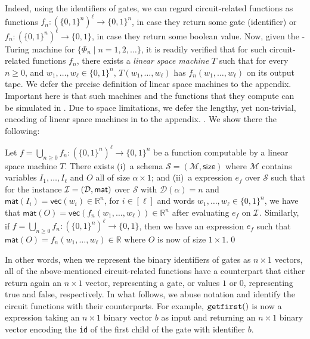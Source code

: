 Indeed, using the identifiers of gates, we can regard circuit-related functions as functions $f_n:(\lbrace 0,1 \rbrace^{n})^\ell\rightarrow\lbrace 0,1 \rbrace^n$, in case they return some gate (identifier) or $f_n:(\lbrace 0,1 \rbrace^{n})^\ell\rightarrow\lbrace 0,1 \rbrace$,
in case they return some boolean value. Now, given the \logspace-Turing machine for $\{\Phi_n\mid n=1,2,\ldots\}$, it is readily verified that for such
circuit-related functions $f_n$, there exists a \textit{linear
space machine} $T$ such that for every $n\geq 0$, and $w_1,\ldots,w_\ell\in\{0,1\}^n$, $T(w_1,\ldots,w_\ell)$ has $f_n(w_1,\ldots,w_\ell)$ on its output tape. We defer the precise definition of linear space machines to the appendix.
Important here is that such machines and the functions that they compute can be simulated in \langfor.
Due to space limitations, we defer the lengthy, yet non-trivial, encoding of linear space machines in \langfor to the appendix.
.
We show there the following:

\begin{proposition} \label{prop:transducer2}
Let $f=\bigcup_{n\geq 0}f_n:(\{0,1\}^n)^\ell\to \{0,1\}^n$ be a function computable by a linear space machine
$T$.
There exists (i)~a \langfor  
schema $\mathcal{S}=(\mathcal{M},\textsf{size})$ where $\mathcal{M}$ contains variables
$I_1,\ldots,I_\ell$ and $O$ all of size $\alpha\times 1$; and (ii)~a \langfor 
expression $e_f$ over $\mathcal{S}$ such that for the instance 
$\mathcal{I}=(\mathcal{D},\textsf{mat})$ over $\mathcal{S}$ with $\mathcal{D}(\alpha)=n$ and 
$\mathsf{mat}(I_i)=\mathsf{vec}(w_i)\in \mathbb{R}^n$,  for $i\in[\ell]$ and words $w_1,\ldots,w_\ell\in\{0,1\}^n$,
we have that  $\mathsf{mat}(O)=\mathsf{vec}(f_n(w_1,\ldots,w_\ell))\in\mathbb{R}^n$ 
after evaluating $e_f$ on $\mathcal{I}$. Similarly, if $f=\bigcup_{n\geq 0}f_n:(\{0,1\}^n)^\ell\to \{0,1\}$, then we have
 an expression $e_f$ such that $\mathsf{mat}(O)=f_n(w_1,\ldots,w_\ell)\in \mathbb{R}$ where $O$ is now of size $1\times 1$.\qed
\end{proposition}

In other words, when we represent the binary identifiers of gates as $n\times 1$ vectors, all of the above-mentioned circuit-related functions have a \langfor counterpart that either return again an $n\times 1$ vector, representing a gate, or values $1$ or $0$, representing true and false, respectively. In what follows, we  abuse notation and identify the circuit functions with their \langfor counterparts. For example, $\texttt{getfirst}()$ is now a \langfor expression taking an $n\times 1$ binary vector $b$ as input and returning an $n\times 1$ binary vector encoding the \texttt{id} of the first child of the gate with identifier $b$.

